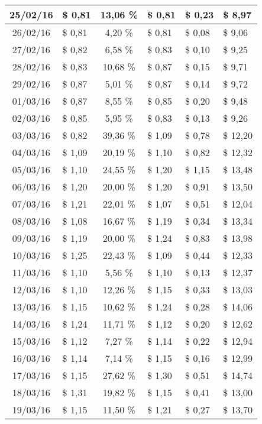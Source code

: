 \begin{center}
\begin{small}
\begin{longtable}{|c|l|c|l|l|l|}
25/02/16 & \$ 0,81 & 13,06 \% & \$ 0,81 & \$ 0,23 & \$ 8,97 \\ \hline
26/02/16 & \$ 0,81 & 4,20 \% & \$ 0,81 & \$ 0,08 & \$ 9,06 \\ \hline
27/02/16 & \$ 0,82 & 6,58 \% & \$ 0,83 & \$ 0,10 & \$ 9,25 \\ \hline
28/02/16 & \$ 0,83 & 10,68 \% & \$ 0,87 & \$ 0,15 & \$ 9,71 \\ \hline
29/02/16 & \$ 0,87 & 5,01 \% & \$ 0,87 & \$ 0,14 & \$ 9,72 \\ \hline
01/03/16 & \$ 0,87 & 8,55 \% & \$ 0,85 & \$ 0,20 & \$ 9,48 \\ \hline
02/03/16 & \$ 0,85 & 5,95 \% & \$ 0,83 & \$ 0,13 & \$ 9,26 \\ \hline
03/03/16 & \$ 0,82 & 39,36 \% & \$ 1,09 & \$ 0,78 & \$ 12,20 \\ \hline
04/03/16 & \$ 1,09 & 20,19 \% & \$ 1,10 & \$ 0,82 & \$ 12,32 \\ \hline
05/03/16 & \$ 1,10 & 24,55 \% & \$ 1,20 & \$ 1,15 & \$ 13,48 \\ \hline
06/03/16 & \$ 1,20 & 20,00 \% & \$ 1,20 & \$ 0,91 & \$ 13,50 \\ \hline
07/03/16 & \$ 1,21 & 22,01 \% & \$ 1,07 & \$ 0,51 & \$ 12,04 \\ \hline
08/03/16 & \$ 1,08 & 16,67 \% & \$ 1,19 & \$ 0,34 & \$ 13,34 \\ \hline
09/03/16 & \$ 1,19 & 20,00 \% & \$ 1,24 & \$ 0,83 & \$ 13,98 \\ \hline
10/03/16 & \$ 1,25 & 22,43 \% & \$ 1,09 & \$ 0,44 & \$ 12,33 \\ \hline
11/03/16 & \$ 1,10 & 5,56 \% & \$ 1,10 & \$ 0,13 & \$ 12,37 \\ \hline
12/03/16 & \$ 1,10 & 12,26 \% & \$ 1,15 & \$ 0,33 & \$ 13,03 \\ \hline
13/03/16 & \$ 1,15 & 10,62 \% & \$ 1,24 & \$ 0,28 & \$ 14,06 \\ \hline
14/03/16 & \$ 1,24 & 11,71 \% & \$ 1,12 & \$ 0,20 & \$ 12,62 \\ \hline
15/03/16 & \$ 1,12 & 7,27 \% & \$ 1,14 & \$ 0,22 & \$ 12,94 \\ \hline
16/03/16 & \$ 1,14 & 7,14 \% & \$ 1,15 & \$ 0,16 & \$ 12,99 \\ \hline
17/03/16 & \$ 1,15 & 27,62 \% & \$ 1,30 & \$ 0,51 & \$ 14,74 \\ \hline
18/03/16 & \$ 1,31 & 19,82 \% & \$ 1,15 & \$ 0,41 & \$ 13,00 \\ \hline
19/03/16 & \$ 1,15 & 11,50 \% & \$ 1,21 & \$ 0,27 & \$ 13,70 \\ \hline

\end{longtable}
\end{small}
\end{center}
